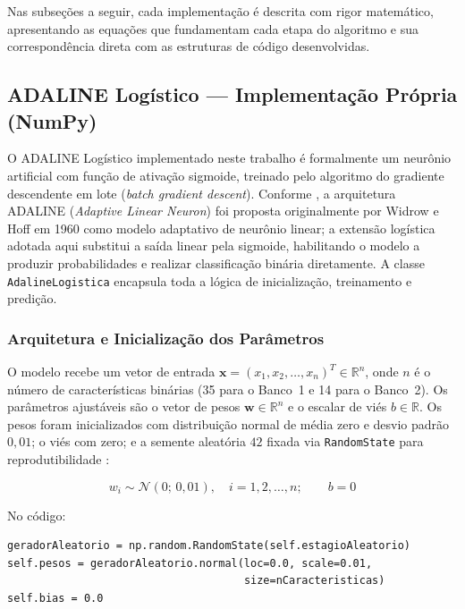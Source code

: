 Nas subseções a seguir, cada implementação é descrita com rigor matemático, apresentando as equações que fundamentam cada etapa do algoritmo e sua correspondência direta com as estruturas de código desenvolvidas.

\subsection{ADALINE Logístico --- Implementação Própria (NumPy)}
\label{sec:adaline_numpy}

O ADALINE Logístico implementado neste trabalho é formalmente um neurônio artificial com função de ativação sigmoide, treinado pelo algoritmo do gradiente descendente em lote (\textit{batch gradient descent}). Conforme , a arquitetura ADALINE (\textit{Adaptive Linear Neuron}) foi proposta originalmente por Widrow e Hoff em 1960 como modelo adaptativo de neurônio linear; a extensão logística adotada aqui substitui a saída linear pela sigmoide, habilitando o modelo a produzir probabilidades e realizar classificação binária diretamente. A classe \texttt{AdalineLogistica} encapsula toda a lógica de inicialização, treinamento e predição.

\subsubsection{Arquitetura e Inicialização dos Parâmetros}

O modelo recebe um vetor de entrada $\mathbf{x} = (x_1, x_2, \ldots, x_n)^T \in \mathbb{R}^n$, onde $n$ é o número de características binárias (35 para o Banco~1 e 14 para o Banco~2). Os parâmetros ajustáveis são o vetor de pesos $\mathbf{w} \in \mathbb{R}^n$ e o escalar de viés $b \in \mathbb{R}$. Os pesos foram inicializados com distribuição normal de média zero e desvio padrão $0{,}01$; o viés com zero; e a semente aleatória $42$ fixada via \texttt{RandomState} para reprodutibilidade \cite{silva2016}:

\begin{equation}
w_i \sim \mathcal{N}(0;\, 0{,}01), \quad i = 1, 2, \ldots, n; \qquad b = 0
\label{eq:adaline_init}
\end{equation}

No código:

\begin{lstlisting}[caption={Inicialização dos parâmetros do ADALINE Logístico.}, label={lst:adaline_init}]
geradorAleatorio = np.random.RandomState(self.estagioAleatorio)
self.pesos = geradorAleatorio.normal(loc=0.0, scale=0.01,
                                     size=nCaracteristicas)
self.bias = 0.0
\end{lstlisting}

